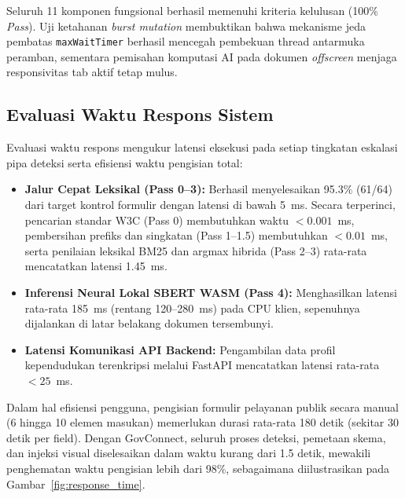 \documentclass[conference]{IEEEtran}
\begin{document}
Seluruh 11 komponen fungsional berhasil memenuhi kriteria kelulusan (100\% \textit{Pass}). Uji ketahanan \textit{burst mutation} membuktikan bahwa mekanisme jeda pembatas \texttt{maxWaitTimer} berhasil mencegah pembekuan thread antarmuka peramban, sementara pemisahan komputasi AI pada dokumen \textit{offscreen} menjaga responsivitas tab aktif tetap mulus.

\subsection{Evaluasi Waktu Respons Sistem}
Evaluasi waktu respons mengukur latensi eksekusi pada setiap tingkatan eskalasi pipa deteksi serta efisiensi waktu pengisian total:
\begin{itemize}[leftmargin=*]
    \item \textbf{Jalur Cepat Leksikal (Pass 0--3):} Berhasil menyelesaikan 95.3\% (61/64) dari target kontrol formulir dengan latensi di bawah 5~ms. Secara terperinci, pencarian standar W3C (Pass 0) membutuhkan waktu $<0.001$~ms, pembersihan prefiks dan singkatan (Pass 1--1.5) membutuhkan $<0.01$~ms, serta penilaian leksikal BM25 dan argmax hibrida (Pass 2--3) rata-rata mencatatkan latensi 1.45~ms.
    \item \textbf{Inferensi Neural Lokal SBERT WASM (Pass 4):} Menghasilkan latensi rata-rata 185~ms (rentang 120--280~ms) pada CPU klien, sepenuhnya dijalankan di latar belakang dokumen tersembunyi.
    \item \textbf{Latensi Komunikasi API Backend:} Pengambilan data profil kependudukan terenkripsi melalui FastAPI mencatatkan latensi rata-rata $<25$~ms.
\end{itemize}

Dalam hal efisiensi pengguna, pengisian formulir pelayanan publik secara manual (6 hingga 10 elemen masukan) memerlukan durasi rata-rata 180 detik (sekitar 30 detik per field). Dengan GovConnect, seluruh proses deteksi, pemetaan skema, dan injeksi visual diselesaikan dalam waktu kurang dari 1.5 detik, mewakili penghematan waktu pengisian lebih dari 98\%, sebagaimana diilustrasikan pada Gambar~\ref{fig:response_time}.
\end{document}
